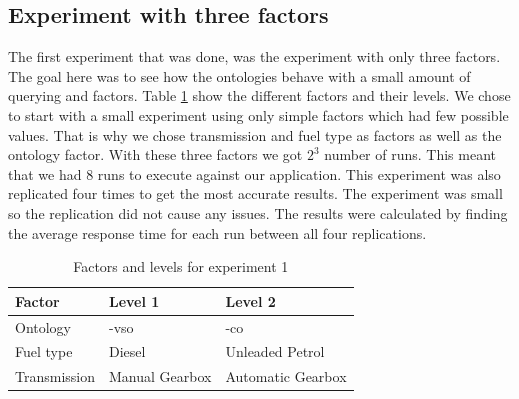 \documentclass{llncs}
\begin{document}
  
\subsection{Experiment with three factors}
The first experiment that was done, was the experiment with only three
factors. The goal here was to see how the ontologies behave with a
small amount of querying and factors.  Table \ref{facandlevExp1} show
the different factors and their levels. We chose to start with a small
experiment using only simple factors which had few possible
values. That is why we chose transmission and fuel type as factors as
well as the ontology factor. With these three factors we got $2^3$
number of runs.  This meant that we had 8 runs to execute against our
application. This experiment was also replicated four times to get the
most accurate results. The experiment was small so the replication did
not cause any issues.  The results were calculated by finding the
average response time for each run between all four replications.

\begin{table}[H]
\begin{center}
    \begin{tabular}{ | l | l l |}
    \hline
    {\bf Factor} & {\bf Level 1} & {\bf Level 2} \\ \hline
	Ontology & -vso & -co \\ \hline 
	Fuel type & Diesel & Unleaded Petrol \\ \hline 
	Transmission & Manual Gearbox & Automatic Gearbox \\ \hline 
    \end{tabular}
\end{center}
\caption{Factors and levels for experiment 1}\label{facandlevExp1}
\end{table}
\end{document}
